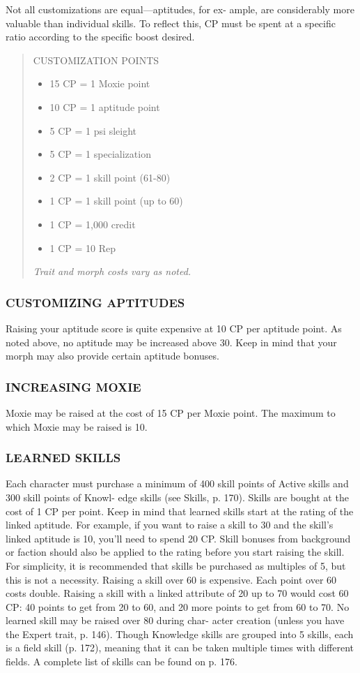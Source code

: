 Not all customizations are equal—aptitudes, for ex-
ample, are considerably more valuable than individual
skills. To reflect this, CP must be spent at a specific
ratio according to the specific boost desired.

\begin{quotation}
CUSTOMIZATION POINTS
\begin{itemize}
\item 15 CP = 1 Moxie point
\item 10 CP = 1 aptitude point
\item 5 CP = 1 psi sleight
\item 5 CP = 1 specialization
\item 2 CP = 1 skill point (61-80)
\item 1 CP = 1 skill point (up to 60)
\item 1 CP = 1,000 credit
\item 1 CP = 10 Rep
\end{itemize}
\textit{Trait and morph costs vary as noted.}
\end{quotation}


\subsubsection{CUSTOMIZING APTITUDES}
Raising your aptitude score is quite expensive at 10
CP per aptitude point. As noted above, no aptitude
may be increased above 30. Keep in mind that your
morph may also provide certain aptitude bonuses.

\subsubsection{INCREASING MOXIE}
Moxie may be raised at the cost of 15 CP per Moxie
point. The maximum to which Moxie may be raised
is 10.

\subsubsection{LEARNED SKILLS}
Each character must purchase a minimum of 400 skill
points of Active skills and 300 skill points of Knowl-
edge skills (see Skills, p. 170). Skills are bought at the
cost of 1 CP per point. Keep in mind that learned
skills start at the rating of the linked aptitude. For
example, if you want to raise a skill to 30 and the
skill’s linked aptitude is 10, you’ll need to spend 20 CP.
Skill bonuses from background or faction should also
be applied to the rating before you start raising the
skill. For simplicity, it is recommended that skills be
purchased as multiples of 5, but this is not a necessity.
Raising a skill over 60 is expensive. Each point over
60 costs double. Raising a skill with a linked attribute
of 20 up to 70 would cost 60 CP: 40 points to get from
20 to 60, and 20 more points to get from 60 to 70.
No learned skill may be raised over 80 during char-
acter creation (unless you have the Expert trait, p. 146).
Though Knowledge skills are grouped into 5 skills,
each is a field skill (p. 172), meaning that it can be
taken multiple times with different fields.
A complete list of skills can be found on p. 176.

